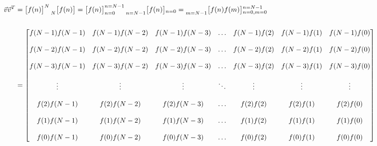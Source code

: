 \documentclass{article}
\begin{document}
\begin{align*}
    \vec{v}\vec{v}^{T}&= \begin{bmatrix} f(n) \end{bmatrix}^{N}\prescript{}{N}{\begin{bmatrix} f(n) \end{bmatrix}}
                       = \begin{bmatrix} f(n) \end{bmatrix}^{n = N - 1}_{n = 0}\prescript{}{n = N - 1}{\begin{bmatrix} f(n) \end{bmatrix}}_{n = 0}
                       = \prescript{}{m = N - 1}{\begin{bmatrix} f(n)f(m) \end{bmatrix}}^{n = N - 1}_{n = 0, m = 0} \\ \\ 
                      &= \begin{bmatrix}
                            f(N - 1)f(N - 1) & f(N - 1)f(N - 2) & f(N - 1)f(N - 3) & \ldots & f(N - 1)f(2) & f(N - 1)f(1) & f(N - 1)f(0) \\ \\
                            f(N - 2)f(N - 1) & f(N - 2)f(N - 2) & f(N - 2)f(N - 3) & \ldots & f(N - 2)f(2) & f(N - 2)f(1) & f(N - 2)f(0) \\ \\
                            f(N - 3)f(N - 1) & f(N - 3)f(N - 2) & f(N - 3)f(N - 3) & \ldots & f(N - 3)f(2) & f(N - 3)f(1) & f(N - 3)f(0) \\ \\
                                      \vdots &           \vdots &           \vdots & \ddots &       \vdots &       \vdots &       \vdots \\ \\
                            f(    2)f(N - 1) & f(    2)f(N - 2) & f(    2)f(N - 3) & \ldots & f(    2)f(2) & f(    2)f(1) & f(    2)f(0) \\ \\
                            f(    1)f(N - 1) & f(    1)f(N - 2) & f(    1)f(N - 3) & \ldots & f(    1)f(2) & f(    1)f(1) & f(    1)f(0) \\ \\
                            f(    0)f(N - 1) & f(    0)f(N - 2) & f(    0)f(N - 3) & \ldots & f(    0)f(2) & f(    0)f(1) & f(    0)f(0)
                           \end{bmatrix} \\ \\ 
  \end{align*}
\end{document}
